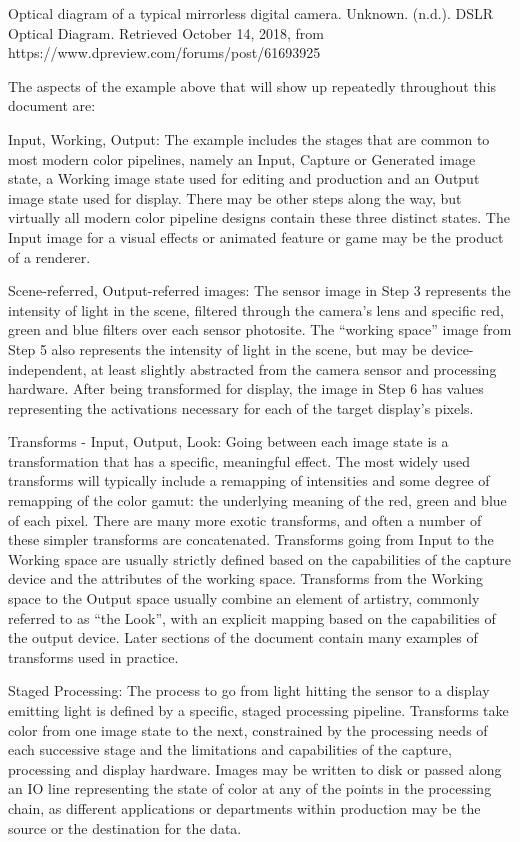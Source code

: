 Optical diagram of a typical mirrorless digital camera.
Unknown. (n.d.). DSLR Optical Diagram. Retrieved October 14, 2018, from https://www.dpreview.com/forums/post/61693925

The aspects of the example above that will show up repeatedly throughout this document are:

Input, Working, Output: The example includes the stages that are common to most modern color pipelines, namely an Input, Capture or Generated image state, a Working image state used for editing and production and an Output image state used for display. There may be other steps along the way, but virtually all modern color pipeline designs contain these three distinct states. The Input image for a visual effects or animated feature or game may be the product of a renderer.

Scene-referred, Output-referred images: The sensor image in Step 3 represents the intensity of light in the scene, filtered through the camera’s lens and specific red, green and blue filters over each sensor photosite. The “working space” image from Step 5 also represents the intensity of light in the scene, but may be device-independent, at least slightly abstracted from the camera sensor and processing hardware. After being transformed for display, the image in Step 6 has values representing the activations necessary for each of the target display’s pixels.

Transforms - Input, Output, Look: Going between each image state is a transformation that has a specific, meaningful effect. The most widely used transforms will typically include a remapping of intensities and some degree of remapping of the color gamut: the underlying meaning of the red, green and blue of each pixel. There are many more exotic transforms, and often a number of these simpler transforms are concatenated. Transforms going from Input to the Working space are usually strictly defined based on the capabilities of the capture device and the attributes of the working space. Transforms from the Working space to the Output space usually combine an element of artistry, commonly referred to as “the Look”, with an explicit mapping based on the capabilities of the output device. Later sections of the document contain many examples of transforms used in practice.

Staged Processing: The process to go from light hitting the sensor to a display emitting light is defined by a specific, staged processing pipeline. Transforms take color from one image state to the next, constrained by the processing needs of each successive stage and the limitations and capabilities of the capture, processing and display hardware. Images may be written to disk or passed along an IO line representing the state of color at any of the points in the processing chain, as different applications or departments within production may be the source or the destination for the data.

